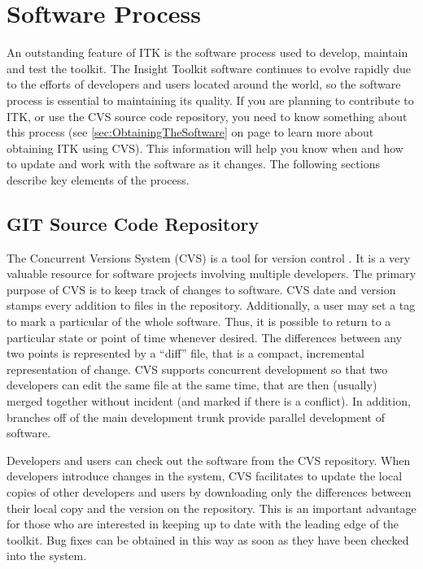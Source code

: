 \chapter{Software Process}
\label{chapter:SoftwareProcess}

An outstanding feature of ITK is the software process used to develop,
maintain and test the toolkit. The Insight Toolkit software continues to
evolve rapidly due to the efforts of developers and users located around the
world, so the software process is essential to maintaining its quality. If
you are planning to contribute to ITK, or use the CVS source code repository,
you need to know something about this process (see
\ref{sec:ObtainingTheSoftware} on page \pageref{sec:ObtainingTheSoftware} to
learn more about obtaining ITK using CVS). This information will help you
know when and how to update and work with the software as it changes. The
following sections describe key elements of the process.

\section{GIT Source Code Repository}
\label{sec:GITRepository}


The Concurrent Versions System (CVS) is a tool for version control
\cite{Fogel1999}. It is a very valuable resource for software projects
involving multiple developers.  The primary purpose of CVS is to keep
track of changes to software. CVS date and version stamps every
addition to files in the repository. Additionally, a user may set a
tag to mark a particular of the whole software. Thus, it is possible
to return to a particular state or point of time whenever desired. The
differences between any two points is represented by a ``diff'' file,
that is a compact, incremental representation of change. CVS supports
concurrent development so that two developers can edit the same file
at the same time, that are then (usually) merged together without
incident (and marked if there is a conflict). In addition, branches
off of the main development trunk provide parallel development of
software.

Developers and users can check out the software from the CVS repository. When
developers introduce changes in the system,  CVS facilitates to update the
local copies of other developers and users by downloading only the differences
between their local copy and the version on the repository.  This is an
important advantage for those who are interested in keeping up to date with the
leading edge of the toolkit. Bug fixes can be obtained in this way as soon as
they have been checked into the system.

